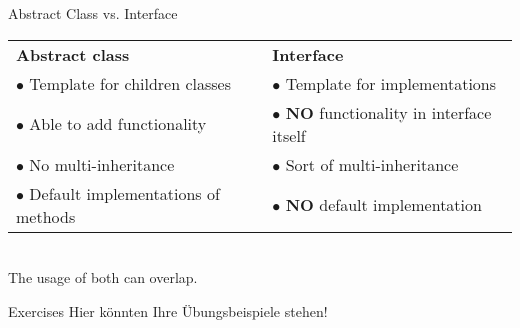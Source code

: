 \begin{frame}{Abstract Class vs. Interface}
	\begin{tabularx}{\textheight}{l|l}
		\textbf{Abstract class} & \textbf{Interface} \\
		$\bullet$ Template for children classes & $\bullet$ Template for implementations \\
		$\bullet$ Able to add functionality & $\bullet$ \textbf{NO} functionality in interface itself \\
		$\bullet$ No multi-inheritance & $\bullet$ Sort of multi-inheritance \\
		$\bullet$ Default implementations of methods & $\bullet$ \textbf{NO} default implementation
	\end{tabularx}\\
	\vspace{0.5cm}
	The usage of both can overlap.
\end{frame}

\begin{frame}[fragile]{Exercises}
	\huge Hier könnten Ihre Übungsbeispiele stehen!
\end{frame}


